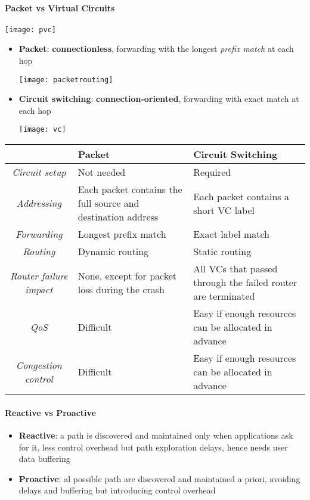 \newpage
\paragraph{Packet vs Virtual Circuits}
\begin{center}
	\texttt{[image: pvc]}
\end{center}
\begin{itemize}
	\item \textbf{Packet}: \textbf{connectionless}, forwarding with the longest \textit{prefix match} at each hop
	\begin{center}
		\texttt{[image: packetrouting]}
	\end{center}
	\item \textbf{Circuit switching}: \textbf{connection-oriented}, forwarding with exact match at each hop
	\begin{center}
		\texttt{[image: vc]}
	\end{center}
\end{itemize}

\begin{table}[!h]
	\centering
	\begin{tabular}{c|p{4cm}|p{4cm}}
		& \textbf{Packet} & \textbf{Circuit Switching} \\
		\hline
		\textit{Circuit setup} & Not needed & Required \\
		\hline
		\textit{Addressing} & Each packet contains the full source and destination address & Each packet contains a short VC label \\
		\hline
		\textit{Forwarding} & Longest prefix match & Exact label match \\
		\hline
		\textit{Routing} & Dynamic routing & Static routing \\
		\hline
		\textit{Router failure impact} & None, except for packet loss during the crash & All VCs that passed through the failed router are terminated \\
		\hline
		\textit{QoS} & Difficult & Easy if enough resources can be allocated in advance \\
		\hline
		\textit{Congestion control} & Difficult & Easy if enough resources can be allocated in advance 
	\end{tabular}
\end{table}

\paragraph{Reactive vs  Proactive}
\begin{itemize}
	\item \textbf{Reactive}: a path is discovered and maintained only when applications ask for it, less control overhead but path exploration delays, hence needs user data buffering
	\item \textbf{Proactive}: al possible path are discovered and maintained a priori, avoiding delays and buffering but introducing control overhead
\end{itemize}

